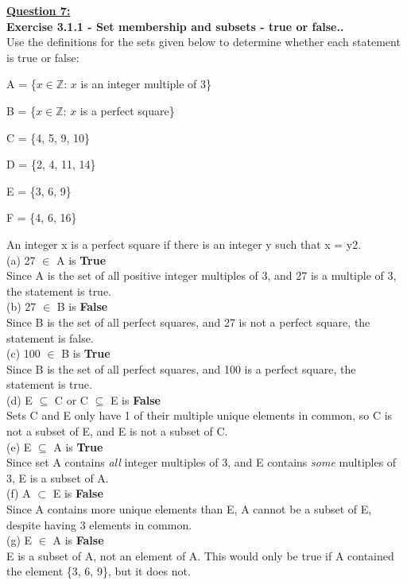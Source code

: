 \documentclass[12pt, letterpaper, twoside]{article}
\begin{document}
\noindent \textbf{\underline{Question 7:}}\\
\textbf{Exercise 3.1.1 - Set membership and subsets - true or false..}\\
Use the definitions for the sets given below to determine whether each statement is true or false:
\begin{description}[noitemsep,topsep=0pt]
\item A = \{$x \in \mathbb{Z}$: $x$ is an integer multiple of 3\}
\item B = \{$x \in \mathbb{Z}$: $x$ is a perfect square\}
\item C = \{4, 5, 9, 10\}
\item D = \{2, 4, 11, 14\}
\item E = \{3, 6, 9\}
\item F = \{4, 6, 16\}
\end{description}
An integer x is a perfect square if there is an integer y such that x = y2.\\
\break
(a) 27 $\in$ A is \textbf{True}\\
Since A is the set of all positive integer multiples of 3, and 27 is a multiple of 3, the statement is true.\\
\break
(b) 27 $\in$ B is \textbf{False}\\
Since B is the set of all perfect squares, and 27 is not a perfect square, the statement is false.\\
\break
(c) 100 $\in$ B is \textbf{True}\\
Since B is the set of all perfect squares, and 100 is a perfect square, the statement is true.\\
\break
(d) E $\subseteq$ C or C $\subseteq$ E is \textbf{False}\\
Sets C and E only have 1 of their multiple unique elements in common, so C is not a subset of E, and E is not a subset of C.\\
\break
(e) E $\subseteq$ A is \textbf{True}\\
Since set A contains \emph{all} integer multiples of 3, and E contains \emph{some} multiples of 3, E is a subset of A.\\
\break
(f) A $\subset$ E is \textbf{False}\\
Since A contains more unique elements than E, A cannot be a subset of E, despite having 3 elements in common.\\
\break
(g) E $\in$ A is \textbf{False}\\
E is a subset of A, not an element of A. This would only be true if A contained the element \{3, 6, 9\}, but it does not.\\
\end{document}
